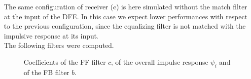 \documentclass[a4paper, 12pt]{report}
\begin{document}
The same configuration of receiver (c) is here simulated without the match filter at the input of the DFE. In this case we expect lower performances with respect to the previous configuration, since the equalizing filter is not matched with the impulsive response at its input.\\
The following filters were computed.

\begin{figure}[H]
	\centering
	\quad
	\caption{Coefficients of the FF filter $c$, of the overall impulse response $\psi_i$ and of the FB filter $b$.}\label{rec_d}
\end{figure}
\end{document}
